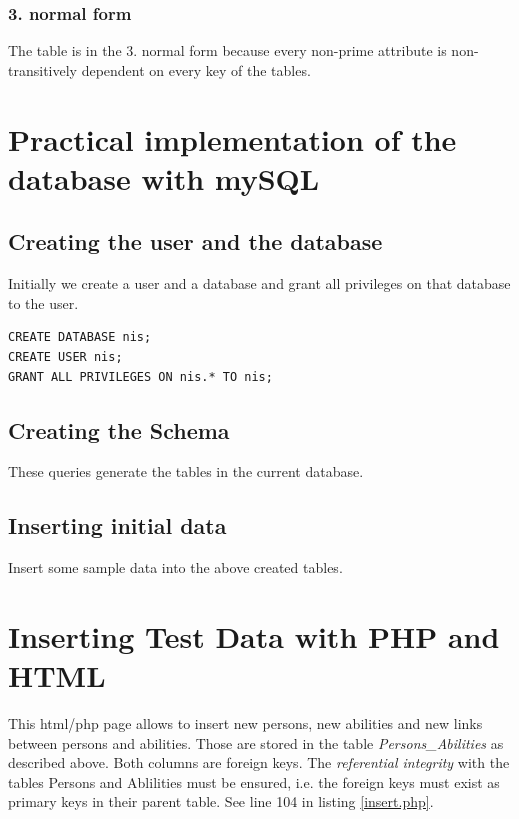 \documentclass[12pt,a4paper,english]{article}
\begin{document}
\subsubsection{3. normal form}
The table is in the 3. normal form because every non-prime attribute is non-transitively dependent on every key of the tables.


\section{Practical implementation of the database with mySQL}
\subsection{Creating the user and the database}
Initially we create a user and a database and grant all privileges on that database
to the user.
\begin{lstlisting}
CREATE DATABASE nis;
CREATE USER nis;
GRANT ALL PRIVILEGES ON nis.* TO nis;
\end{lstlisting}

\subsection{Creating the Schema}
These queries generate the tables in the current database.


\subsection{Inserting initial data}
Insert some sample data into the above created tables.


\section{Inserting Test Data with PHP and HTML} \label{sec:insert}
This html/php page allows to insert new persons, new abilities and new links between persons and abilities.
Those are stored in the table \emph{Persons\_Abilities} as described above. Both columns are foreign keys.
The \emph{referential integrity} with the tables Persons and Ablilities must be ensured, i.e. the foreign keys
must exist as primary keys in their parent table. See line 104 in listing \ref{insert.php}.
\end{document}
